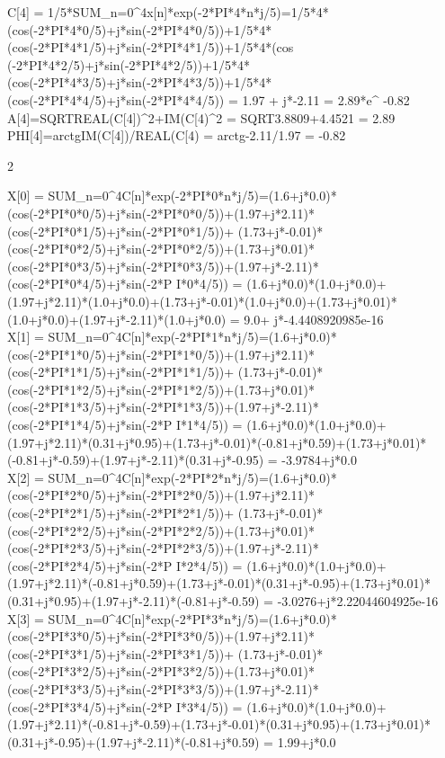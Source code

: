 \documentclass[14pt,a4paper]{scrartcl}
\begin{document}
C[4] = 1/5*SUM_{n=0}^{4}{x[n]*exp(-2*PI*4*n*j/5)}=1/5*4*(cos(-2*PI*4*0/5)+j*sin(-2*PI*4*0/5))+1/5*4*(cos(-2*PI*4*1/5)+j*sin(-2*PI*4*1/5))+1/5*4*(cos
(-2*PI*4*2/5)+j*sin(-2*PI*4*2/5))+1/5*4*(cos(-2*PI*4*3/5)+j*sin(-2*PI*4*3/5))+1/5*4*(cos(-2*PI*4*4/5)+j*sin(-2*PI*4*4/5)) = 1.97 + j*-2.11 = 2.89*e^
{-0.82}\\
A[4]=SQRT{REAL(C[4])^2+IM(C[4)^2} = SQRT{3.8809+4.4521} = 2.89\\
PHI[4]=arctg{IM(C[4])/REAL(C[4)} = arctg{-2.11/1.97} = -0.82\\
\begin{center}
\begin{Large}
2
\end{Large}
\end{center}
X[0] = SUM_{n=0}^{4}{C[n]*exp(-2*PI*0*n*j/5)}=(1.6+j*0.0)*(cos(-2*PI*0*0/5)+j*sin(-2*PI*0*0/5))+(1.97+j*2.11)*(cos(-2*PI*0*1/5)+j*sin(-2*PI*0*1/5))+
(1.73+j*-0.01)*(cos(-2*PI*0*2/5)+j*sin(-2*PI*0*2/5))+(1.73+j*0.01)*(cos(-2*PI*0*3/5)+j*sin(-2*PI*0*3/5))+(1.97+j*-2.11)*(cos(-2*PI*0*4/5)+j*sin(-2*P
I*0*4/5)) = (1.6+j*0.0)*(1.0+j*0.0)+(1.97+j*2.11)*(1.0+j*0.0)+(1.73+j*-0.01)*(1.0+j*0.0)+(1.73+j*0.01)*(1.0+j*0.0)+(1.97+j*-2.11)*(1.0+j*0.0) = 9.0+
j*-4.4408920985e-16\\

X[1] = SUM_{n=0}^{4}{C[n]*exp(-2*PI*1*n*j/5)}=(1.6+j*0.0)*(cos(-2*PI*1*0/5)+j*sin(-2*PI*1*0/5))+(1.97+j*2.11)*(cos(-2*PI*1*1/5)+j*sin(-2*PI*1*1/5))+
(1.73+j*-0.01)*(cos(-2*PI*1*2/5)+j*sin(-2*PI*1*2/5))+(1.73+j*0.01)*(cos(-2*PI*1*3/5)+j*sin(-2*PI*1*3/5))+(1.97+j*-2.11)*(cos(-2*PI*1*4/5)+j*sin(-2*P
I*1*4/5)) = (1.6+j*0.0)*(1.0+j*0.0)+(1.97+j*2.11)*(0.31+j*0.95)+(1.73+j*-0.01)*(-0.81+j*0.59)+(1.73+j*0.01)*(-0.81+j*-0.59)+(1.97+j*-2.11)*(0.31+j*-0.95) = -3.9784+j*0.0\\

X[2] = SUM_{n=0}^{4}{C[n]*exp(-2*PI*2*n*j/5)}=(1.6+j*0.0)*(cos(-2*PI*2*0/5)+j*sin(-2*PI*2*0/5))+(1.97+j*2.11)*(cos(-2*PI*2*1/5)+j*sin(-2*PI*2*1/5))+
(1.73+j*-0.01)*(cos(-2*PI*2*2/5)+j*sin(-2*PI*2*2/5))+(1.73+j*0.01)*(cos(-2*PI*2*3/5)+j*sin(-2*PI*2*3/5))+(1.97+j*-2.11)*(cos(-2*PI*2*4/5)+j*sin(-2*P
I*2*4/5)) = (1.6+j*0.0)*(1.0+j*0.0)+(1.97+j*2.11)*(-0.81+j*0.59)+(1.73+j*-0.01)*(0.31+j*-0.95)+(1.73+j*0.01)*(0.31+j*0.95)+(1.97+j*-2.11)*(-0.81+j*-0.59) = -3.0276+j*2.22044604925e-16\\

X[3] = SUM_{n=0}^{4}{C[n]*exp(-2*PI*3*n*j/5)}=(1.6+j*0.0)*(cos(-2*PI*3*0/5)+j*sin(-2*PI*3*0/5))+(1.97+j*2.11)*(cos(-2*PI*3*1/5)+j*sin(-2*PI*3*1/5))+
(1.73+j*-0.01)*(cos(-2*PI*3*2/5)+j*sin(-2*PI*3*2/5))+(1.73+j*0.01)*(cos(-2*PI*3*3/5)+j*sin(-2*PI*3*3/5))+(1.97+j*-2.11)*(cos(-2*PI*3*4/5)+j*sin(-2*P
I*3*4/5)) = (1.6+j*0.0)*(1.0+j*0.0)+(1.97+j*2.11)*(-0.81+j*-0.59)+(1.73+j*-0.01)*(0.31+j*0.95)+(1.73+j*0.01)*(0.31+j*-0.95)+(1.97+j*-2.11)*(-0.81+j*0.59) = 1.99+j*0.0\\
\end{document}

